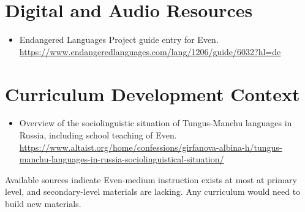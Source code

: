 \documentclass[12pt]{article}
\begin{document}
\section{Digital and Audio Resources}
\begin{itemize}
\item Endangered Languages Project guide entry for Even. \url{https://www.endangeredlanguages.com/lang/1206/guide/6032?hl=de}
\end{itemize}
\section{Curriculum Development Context}
\begin{itemize}
\item Overview of the sociolinguistic situation of Tungus-Manchu languages in Russia, including school teaching of Even. \url{https://www.altaist.org/home/confessions/girfanova-albina-h/tungus-manchu-languages-in-russia-sociolinguistical-situation/}
\end{itemize}
Available sources indicate Even-medium instruction exists at most at primary level, and secondary-level materials are lacking. Any curriculum would need to build new materials.
\end{document}
